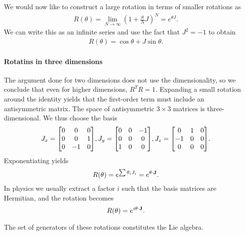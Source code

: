 We would now like to construct a large rotation in terms of smaller rotations as
\begin{align*}
R(\theta) = \lim\limits_{N\to\infty}\left(1 + \frac{\theta}{N}J\right)^{N} = e^{\theta J}.
\end{align*}
We can write this as an infinite series and use the fact that $J^{2} = -1$ to obtain
\begin{align*}
R(\theta) = \cos{\theta} + J\sin{\theta}.
\end{align*}

\paragraph{Rotatins in three dimensions}
The argument done for two dimensions does not use the dimensionality, so we conclude that even for higher dimensions, $R^{T}R = 1$. Expanding a small rotation around the identity yields that the first-order term must include an antisymmetric matrix. The space of antisymmetric $3\times 3$ matrices is three-dimensional. We thus choose the basis
\begin{align*}
J_{x} =
\mqty[
0 & 0  & 0 \\
0 & 0  & 1 \\
0 & -1 & 0
],
J_{y} =
\mqty[
0 & 0 & -1 \\
0 & 0 & 0  \\
1 & 0 & 0
],
J_{z} =
\mqty[
0  & 1 & 0 \\
-1 & 0 & 0 \\
0  & 0 & 0
].
\end{align*}
Exponentiating yields
\begin{align*}
R(\theta) = e^{\sum \theta_{i}J_{i}} = e^{\vb{\theta}\cdot\vb{J}}.
\end{align*}
In physics we usually extract a factor $i$ such that the basis matrices are Hermitian, and the rotation becomes
\begin{align*}
R(\theta) = e^{i\vb{\theta}\cdot\vb{J}}.
\end{align*}

The set of generators of these rotations constitutes the Lie algebra.

